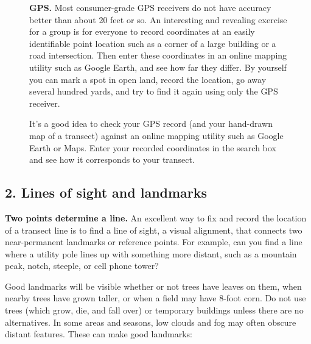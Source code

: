 \documentclass[11pt,letterpaper,twoside,onecolumn]{memoir}
\begin{document}
\begin{figure}
\begin{tcolorbox}
\setlength{\parskip}{.7em}
\textbf{GPS.} Most consumer-grade GPS receivers do not have accuracy better than about 20 feet or so. An interesting and revealing exercise for a group is for everyone to record coordinates at an easily identifiable point location such as a corner of a large building or a road intersection. Then enter these coordinates in an online mapping utility such as Google Earth, and see how far they differ. By yourself you can mark a spot in open land, record the location, go away several hundred yards, and try to find it again using only the GPS receiver.

It's a good idea to check your GPS record (and your hand-drawn map of a transect) against an online mapping utility such as Google Earth or Maps. Enter your recorded coordinates in the search box and see how it corresponds to your transect. 
\end{tcolorbox}
\end{figure}


\subsection*{2. Lines of sight and landmarks}

\textbf{Two points determine a line.} An excellent way to fix and record the location of a transect line is to find a line of sight, a visual alignment, that connects two near-permanent landmarks or reference points. For example, can you find a line where a utility pole lines up with something more distant, such as a mountain peak, notch, steeple, or cell phone tower?

Good landmarks will be visible whether or not trees have leaves on them, when nearby trees have grown taller, or when a field may have 8-foot corn. Do not use trees (which grow, die, and fall over) or temporary buildings unless there are no alternatives. In some areas and seasons, low clouds and fog may often obscure distant features. These can make good landmarks:
\end{document}
